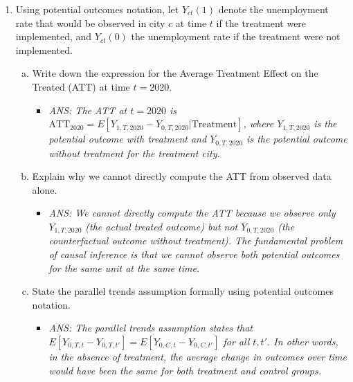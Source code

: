 \documentclass[12pt,a4paper]{article}
\newcommand{\ans}[1]{\begin{itemize}\item[$\bullet$] \textit{ANS: #1}\end{itemize}}
\begin{document}
\begin{enumerate}
\item Using potential outcomes notation, let $Y_{ct}(1)$ denote the unemployment rate that would be observed in city $c$ at time $t$ if the treatment were implemented, and $Y_{ct}(0)$ the unemployment rate if the treatment were not implemented.
\begin{enumerate}[(a)]
\item Write down the expression for the Average Treatment Effect on the Treated (ATT) at time $t=2020$.
\ans{The ATT at $t=2020$ is $\text{ATT}_{2020}=E[Y_{1,T,2020}-Y_{0,T,2020}|\text{Treatment}]$, where $Y_{1,T,2020}$ is the potential outcome with treatment and $Y_{0,T,2020}$ is the potential outcome without treatment for the treatment city.}

\item Explain why we cannot directly compute the ATT from observed data alone.
\ans{We cannot directly compute the ATT because we observe only $Y_{1,T,2020}$ (the actual treated outcome) but not $Y_{0,T,2020}$ (the counterfactual outcome without treatment). The fundamental problem of causal inference is that we cannot observe both potential outcomes for the same unit at the same time.}

\item State the parallel trends assumption formally using potential outcomes notation.
\ans{The parallel trends assumption states that $E[Y_{0,T,t}-Y_{0,T,t'}]=E[Y_{0,C,t}-Y_{0,C,t'}]$ for all $t,t'$. In other words, in the absence of treatment, the average change in outcomes over time would have been the same for both treatment and control groups.}
\end{enumerate}

\end{enumerate}
\end{document}

